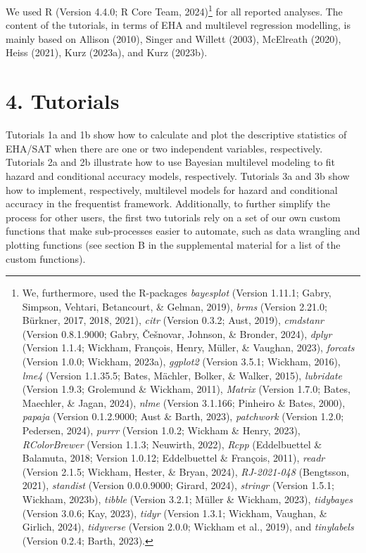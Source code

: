 \documentclass[
  man, donotrepeattitle,floatsintext]{apa6}
\begin{document}
We used R (Version 4.4.0; R Core Team, 2024)\footnote{We, furthermore, used the R-packages \emph{bayesplot} (Version 1.11.1; Gabry, Simpson, Vehtari, Betancourt, \& Gelman, 2019), \emph{brms} (Version 2.21.0; Bürkner, 2017, 2018, 2021), \emph{citr} (Version 0.3.2; Aust, 2019), \emph{cmdstanr} (Version 0.8.1.9000; Gabry, Češnovar, Johnson, \& Bronder, 2024), \emph{dplyr} (Version 1.1.4; Wickham, François, Henry, Müller, \& Vaughan, 2023), \emph{forcats} (Version 1.0.0; Wickham, 2023a), \emph{ggplot2} (Version 3.5.1; Wickham, 2016), \emph{lme4} (Version 1.1.35.5; Bates, Mächler, Bolker, \& Walker, 2015), \emph{lubridate} (Version 1.9.3; Grolemund \& Wickham, 2011), \emph{Matrix} (Version 1.7.0; Bates, Maechler, \& Jagan, 2024), \emph{nlme} (Version 3.1.166; Pinheiro \& Bates, 2000), \emph{papaja} (Version 0.1.2.9000; Aust \& Barth, 2023), \emph{patchwork} (Version 1.2.0; Pedersen, 2024), \emph{purrr} (Version 1.0.2; Wickham \& Henry, 2023), \emph{RColorBrewer} (Version 1.1.3; Neuwirth, 2022), \emph{Rcpp} (Eddelbuettel \& Balamuta, 2018; Version 1.0.12; Eddelbuettel \& François, 2011), \emph{readr} (Version 2.1.5; Wickham, Hester, \& Bryan, 2024), \emph{RJ-2021-048} (Bengtsson, 2021), \emph{standist} (Version 0.0.0.9000; Girard, 2024), \emph{stringr} (Version 1.5.1; Wickham, 2023b), \emph{tibble} (Version 3.2.1; Müller \& Wickham, 2023), \emph{tidybayes} (Version 3.0.6; Kay, 2023), \emph{tidyr} (Version 1.3.1; Wickham, Vaughan, \& Girlich, 2024), \emph{tidyverse} (Version 2.0.0; Wickham et al., 2019), and \emph{tinylabels} (Version 0.2.4; Barth, 2023).} for all reported analyses. The content of the tutorials, in terms of EHA and multilevel regression modelling, is mainly based on Allison (2010), Singer and Willett (2003), McElreath (2020), Heiss (2021), Kurz (2023a), and Kurz (2023b).

\section{4. Tutorials}\label{tutorials}

Tutorials 1a and 1b show how to calculate and plot the descriptive statistics of EHA/SAT when there are one or two independent variables, respectively. Tutorials 2a and 2b illustrate how to use Bayesian multilevel modeling to fit hazard and conditional accuracy models, respectively. Tutorials 3a and 3b show how to implement, respectively, multilevel models for hazard and conditional accuracy in the frequentist framework.
Additionally, to further simplify the process for other users, the first two tutorials rely on a set of our own custom functions that make sub-processes easier to automate, such as data wrangling and plotting functions (see section B in the supplemental material for a list of the custom functions).
\end{document}
